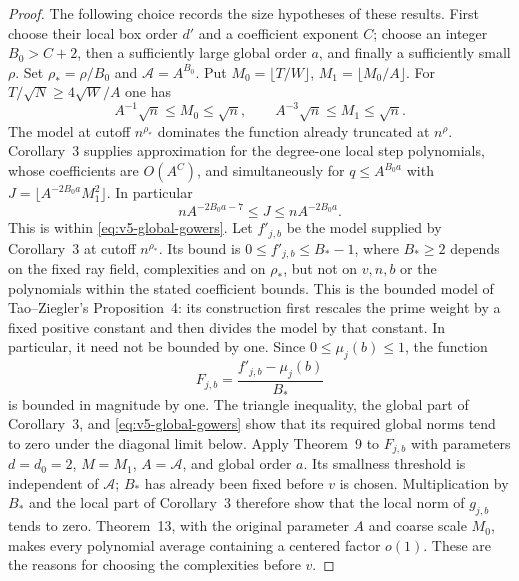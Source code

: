 \begin{proof}
The following choice records the size hypotheses of these results.
First choose their local box order $d'$ and a coefficient exponent $C$;
choose an integer $B_0>C+2$, then a sufficiently large global order $a$,
and finally a sufficiently small $\rho$. Set $\rho_* =\rho/B_0$ and
$\mathcal A=A^{B_0}$. Put
$M_0=\lfloor T/W\rfloor$, $M_1=\lfloor M_0/A\rfloor$.
For $T/\sqrt N\geq4\sqrt W/A$ one has
\[
 A^{-1}\sqrt n\leq M_0\leq\sqrt n,
 \qquad A^{-3}\sqrt n\leq M_1\leq\sqrt n.
\]
The model at cutoff $n^{\rho_*}$ dominates the function already truncated
at $n^\rho$. Corollary~3 supplies approximation for the degree-one local
step polynomials, whose coefficients are $O(A^C)$, and simultaneously for
$q\leq A^{B_0a}$ with
$J=\lfloor A^{-2B_0a}M_1^2\rfloor$.
In particular
\[
 nA^{-2B_0a-7}\leq J\leq nA^{-2B_0a}.
\]
This is within \eqref{eq:v5-global-gowers}. Let $f'_{j,b}$ be the
model supplied by Corollary~3 at cutoff $n^{\rho_*}$. Its bound is
$0\leq f'_{j,b}\leq B_*-1$, where $B_*\geq2$ depends on the fixed
ray field, complexities and on $\rho_*$, but not on $v,n,b$ or the polynomials
within the stated coefficient bounds. This is the bounded model of
Tao--Ziegler's Proposition~4: its construction first rescales the
prime weight by a fixed positive constant and then divides the model
by that constant. In particular, it need not be bounded by one.
Since $0\leq\mu_j(b)\leq1$, the function
\[
 F_{j,b}=\frac{f'_{j,b}-\mu_j(b)}{B_*}
\]
is bounded in magnitude by one. The triangle inequality, the global
part of Corollary~3, and \eqref{eq:v5-global-gowers} show that its
required global norms tend to zero under the diagonal limit below.
Apply Theorem~9 to $F_{j,b}$
with parameters $d=d_0=2$, $M=M_1$, $A=\mathcal A$, and global
order $a$. Its smallness threshold is independent of $\mathcal A$;
$B_*$ has already been fixed before $v$ is chosen. Multiplication
by $B_*$ and the local part of Corollary~3 therefore show that the
local norm of $g_{j,b}$ tends to zero. Theorem~13, with the original
parameter $A$ and coarse scale $M_0$, makes every polynomial average
containing a centered factor $o(1)$. These are the reasons for choosing
the complexities before $v$.


\end{proof}
